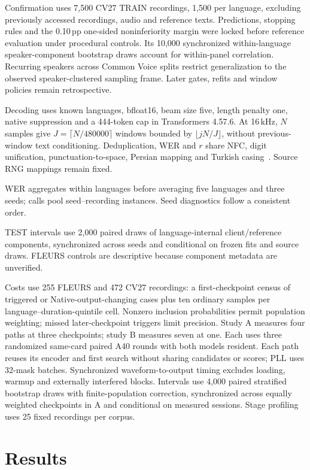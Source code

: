 \documentclass[conference,letterpaper]{IEEEtran}
\begin{document}
Confirmation uses 7,500 CV27 TRAIN recordings, 1,500 per language, excluding previously accessed recordings, audio and reference texts. Predictions, stopping rules and the 0.10\,pp one-sided noninferiority margin were locked before reference evaluation under procedural controls. Its 10,000 synchronized within-language speaker-component bootstrap draws account for within-panel correlation. Recurring speakers across Common Voice splits restrict generalization to the observed speaker-clustered sampling frame. Later gates, refits and window policies remain retrospective.

Decoding uses known languages, bfloat16, beam size five, length penalty one, native suppression and a 444-token cap in Transformers 4.57.6. At 16\,kHz, $N$ samples give $J=\lceil N/480000\rceil$ windows bounded by $\lfloor jN/J\rfloor$, without previous-window text conditioning. Deduplication, WER and $r$ share NFC, digit unification, punctuation-to-space, Persian mapping and Turkish casing~\cite{normalization}. Source RNG mappings remain fixed.

WER aggregates within languages before averaging five languages and three seeds; calls pool seed--recording instances. Seed diagnostics follow a consistent order.

\newpage
TEST intervals use 2,000 paired draws of language-internal client/reference components, synchronized across seeds and conditional on frozen fits and source draws. FLEURS controls are descriptive because component metadata are unverified.

Costs use 255 FLEURS and 472 CV27 recordings: a first-checkpoint census of triggered or Native-output-changing cases plus ten ordinary samples per language--duration-quintile cell. Nonzero inclusion probabilities permit population weighting; missed later-checkpoint triggers limit precision. Study A measures four paths at three checkpoints; study B measures seven at one. Each uses three randomized same-card paired A40 rounds with both models resident. Each path reuses its encoder and first search without sharing candidates or scores; PLL uses 32-mask batches. Synchronized waveform-to-output timing excludes loading, warmup and externally interfered blocks. Intervals use 4,000 paired stratified bootstrap draws with finite-population correction, synchronized across equally weighted checkpoints in A and conditional on measured sessions. Stage profiling uses 25 fixed recordings per corpus.

\section{Results}

\end{document}
